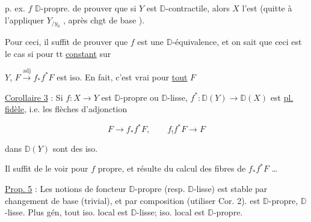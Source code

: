 
   p. ex. $f$ $\mathbb D$-propre.   de prouver que si $Y$ est $\mathbb D$-contractile, alors $X$ l'est  (quitte à l'appliquer  $Y_{/y_0}$ , après chgt de base ).


Pour ceci, il suffit de prouver que $f$ est une $\mathbb D$-équivalence, et on sait que ceci est le cas si pour tt  \uline{constant} sur


$Y$,  $F\xrightarrow{\mathrm{adj}} f_*f^*F$ est iso. En fait, c'est vrai pour \uline{tout} $F$ \unsure{;|:}

\uline{Corollaire 3} : Si $f:X\longrightarrow Y$ est  $\mathbb D$-propre ou $\mathbb D$-lisse,  $f^*:\mathbb D(Y)\longrightarrow\mathbb D(X)$ est \uline{pl. fidèle}, i.e. les flèches d'adjonction

\[
 F\longrightarrow f_*f^*F,\qquad f_!f^*F\longrightarrow F
\]

dans $\mathbb D(Y)$ sont des iso.

Il suffit de le voir pour $f$ propre, et  résulte du calcul des fibres de $f_*f^*F$ \ldots


 \uline{Prop. 5} : Les notions de foncteur $\mathbb D$-propre (resp. $\mathbb D$-lisse) est stable par changement de base (trivial), et par composition (utiliser Cor. 2).    est  $\mathbb D$-propre,   $\mathbb D$-lisse. Plus gén, tout iso. local est $\mathbb D$-lisse;  iso. local est $\mathbb D$-propre.

